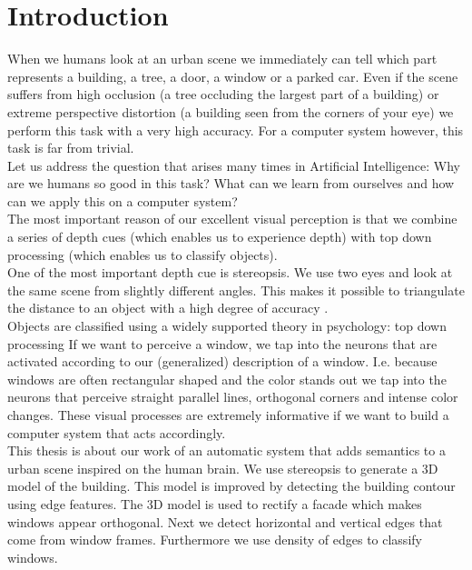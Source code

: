 \section{Introduction}
When we humans look at an urban scene we immediately can tell which part
represents a building, a tree, a door, a window or a parked car.
Even if the scene suffers from high occlusion (a tree occluding the largest part
of a building) or extreme perspective distortion (a building seen from the
corners of your eye) we perform this task with a very high accuracy.
For a computer system however, this task is far from trivial.\\

Let us address the question that arises many times in Artificial Intelligence:
Why are we humans so good in this task? What can we learn from ourselves 
and how can we apply this on a computer system?\\

The most important reason of our excellent visual perception is that we combine 
a series of depth cues \cite{psy} (which enables us to experience depth) with top down
processing (which enables us to classify objects).\\

One of the most important depth cue is stereopsis.  We use two eyes and look at
the same scene from slightly different angles.  This makes it possible to
triangulate the distance to an object with a high degree of accuracy
\cite{psy} \cite{hartley}. \\ 

Objects are classified using a widely supported theory in psychology: top down processing \cite{anderson}
If we want to perceive a window, we tap into the neurons that are activated according to
our (generalized) description of a window.  I.e. because windows are often
rectangular shaped and the color stands out we tap into the neurons that
perceive straight parallel lines, orthogonal corners and intense color changes.
These visual processes are extremely informative if we want to build a computer system
that acts accordingly.  \\

This thesis is about our work of an automatic system that adds semantics to a
urban scene inspired on the human brain.  We use stereopsis to generate a 3D
model of the building. This model is improved by detecting the building contour
using edge features.  The 3D model is used to rectify a facade which makes
windows appear orthogonal.  Next we detect horizontal and vertical edges that
come from window frames.  Furthermore we use density of edges to classify
windows.\\


